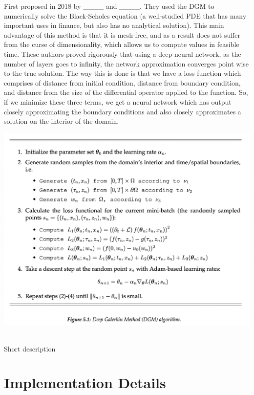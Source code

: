 \documentclass[14pt]{article}
\begin{document}
First proposed in 2018 by \_\_\_\_ and \_\_\_\_. They used the DGM to numerically solve the Black-Scholes equation (a well-studied PDE that has many important uses in finance, but also has no analytical solution). This main advantage of this method is that it is mesh-free, and as a result does not suffer from the curse of dimensionality, which allows us to compute values in feasible time. These authors proved rigorously that using a deep neural network, as the number of layers goes to infinity, the network approximation converges point wise to the true solution. The way this is done is that we have a loss function which comprises of distance from initial condition, distance from boundary condition, and distance from the size of the differential operator applied to the function. So, if we minimize these three terms, we get a neural network which has output closely approximating the boundary conditions and also closely approximates a solution on the interior of the domain.
\newpage
\begin{center}
\includegraphics[scale=0.5]{DGM_Algorithm.png}
\end{center}\\
Short description

\section{ Implementation Details }
\end{document}

